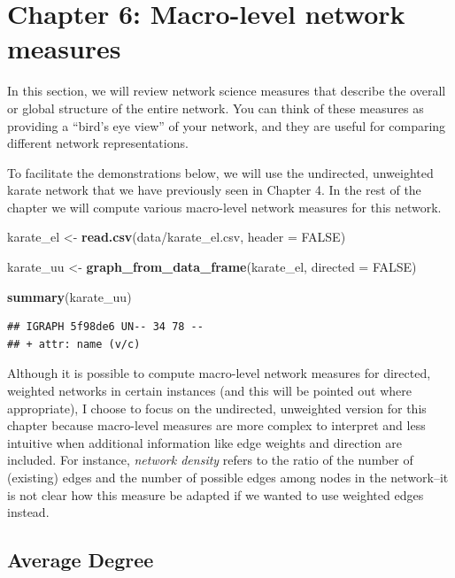 \documentclass[
]{book}
\newenvironment{Shaded}{\begin{snugshade}}{\end{snugshade}}
\newcommand{\AttributeTok}[1]{\textcolor[rgb]{0.13,0.29,0.53}{#1}}
\newcommand{\ConstantTok}[1]{\textcolor[rgb]{0.56,0.35,0.01}{#1}}
\newcommand{\FunctionTok}[1]{\textcolor[rgb]{0.13,0.29,0.53}{\textbf{#1}}}
\newcommand{\NormalTok}[1]{#1}
\newcommand{\OtherTok}[1]{\textcolor[rgb]{0.56,0.35,0.01}{#1}}
\newcommand{\StringTok}[1]{\textcolor[rgb]{0.31,0.60,0.02}{#1}}
\begin{document}
\chapter{Chapter 6: Macro-level network measures}\label{ch6}

In this section, we will review network science measures that describe the overall or global structure of the entire network. You can think of these measures as providing a ``bird's eye view'' of your network, and they are useful for comparing different network representations.

To facilitate the demonstrations below, we will use the undirected, unweighted karate network that we have previously seen in Chapter 4. In the rest of the chapter we will compute various macro-level network measures for this network.

\begin{Shaded}
\begin{Highlighting}[]
\NormalTok{karate\_el }\OtherTok{\textless{}{-}} \FunctionTok{read.csv}\NormalTok{(}\StringTok{\textquotesingle{}data/karate\_el.csv\textquotesingle{}}\NormalTok{, }\AttributeTok{header =} \ConstantTok{FALSE}\NormalTok{)}

\NormalTok{karate\_uu }\OtherTok{\textless{}{-}} \FunctionTok{graph\_from\_data\_frame}\NormalTok{(karate\_el, }\AttributeTok{directed =} \ConstantTok{FALSE}\NormalTok{)}

\FunctionTok{summary}\NormalTok{(karate\_uu)}
\end{Highlighting}
\end{Shaded}

\begin{verbatim}
## IGRAPH 5f98de6 UN-- 34 78 -- 
## + attr: name (v/c)
\end{verbatim}

Although it is possible to compute macro-level network measures for directed, weighted networks in certain instances (and this will be pointed out where appropriate), I choose to focus on the undirected, unweighted version for this chapter because macro-level measures are more complex to interpret and less intuitive when additional information like edge weights and direction are included. For instance, \emph{network density} refers to the ratio of the number of (existing) edges and the number of possible edges among nodes in the network--it is not clear how this measure be adapted if we wanted to use weighted edges instead.

\section{Average Degree}\label{average-degree}
\end{document}
